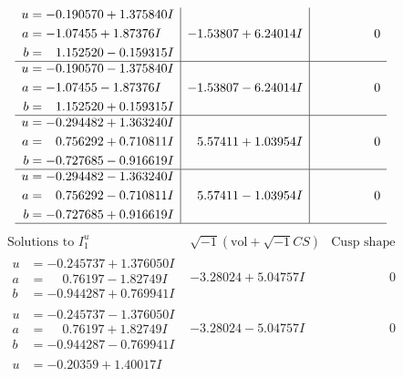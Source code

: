 \documentclass[1p]{elsarticle_modified}
\theoremstyle{definition}
\newcommand{\I}{\sqrt{-1}}
\begin{document}
$$\begin{array}{c|c|c}
\begin{aligned}
u &= -0.190570 + 1.375840 I \\
a &= -1.07455 + 1.87376 I \\
b &= \phantom{-}1.152520 - 0.159315 I\end{aligned}
 & -1.53807 + 6.24014 I & \phantom{-0.000000 } 0 \\ \hline\begin{aligned}
u &= -0.190570 - 1.375840 I \\
a &= -1.07455 - 1.87376 I \\
b &= \phantom{-}1.152520 + 0.159315 I\end{aligned}
 & -1.53807 - 6.24014 I & \phantom{-0.000000 } 0 \\ \hline\begin{aligned}
u &= -0.294482 + 1.363240 I \\
a &= \phantom{-}0.756292 + 0.710811 I \\
b &= -0.727685 - 0.916619 I\end{aligned}
 & \phantom{-}5.57411 + 1.03954 I & \phantom{-0.000000 } 0 \\ \hline\begin{aligned}
u &= -0.294482 - 1.363240 I \\
a &= \phantom{-}0.756292 - 0.710811 I \\
b &= -0.727685 + 0.916619 I\end{aligned}
 & \phantom{-}5.57411 - 1.03954 I & \phantom{-0.000000 } 0\\
 \hline 
 \end{array}$$\newpage$$\begin{array}{c|c|c}  
\text{Solutions to }I^u_{1}& \I (\text{vol} + \sqrt{-1}CS) & \text{Cusp shape}\\
 \hline 
\begin{aligned}
u &= -0.245737 + 1.376050 I \\
a &= \phantom{-}0.76197 - 1.82749 I \\
b &= -0.944287 + 0.769941 I\end{aligned}
 & -3.28024 + 5.04757 I & \phantom{-0.000000 } 0 \\ \hline\begin{aligned}
u &= -0.245737 - 1.376050 I \\
a &= \phantom{-}0.76197 + 1.82749 I \\
b &= -0.944287 - 0.769941 I\end{aligned}
 & -3.28024 - 5.04757 I & \phantom{-0.000000 } 0 \\ \hline\begin{aligned}
u &= -0.20359 + 1.40017 I \\

\end{aligned}
\end{array}$$
\end{document}
